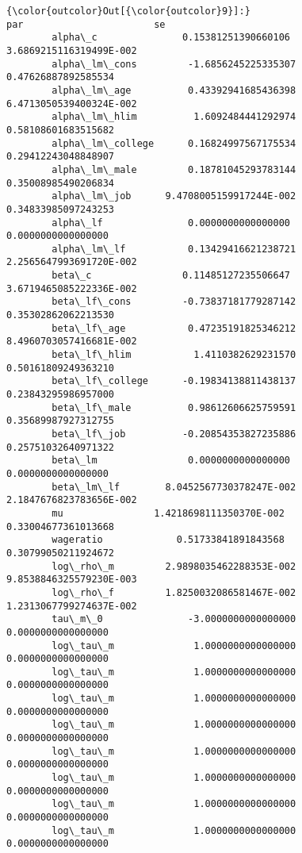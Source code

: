 \documentclass[11pt]{article}
\begin{document}
\begin{Verbatim}[commandchars=\\\{\}]
{\color{outcolor}Out[{\color{outcolor}9}]:}                                       par                       se
        alpha\_c               0.15381251390660106  3.6869215116319499E-002
        alpha\_lm\_cons         -1.6856245225335307      0.47626887892585534
        alpha\_lm\_age          0.43392941685436398  6.4713050539400324E-002
        alpha\_lm\_hlim          1.6092484441292974      0.58108601683515682
        alpha\_lm\_college      0.16824997567175534      0.29412243048848907
        alpha\_lm\_male         0.18781045293783144      0.35008985490206834
        alpha\_lm\_job      9.4708005159917244E-002      0.34833985097243253
        alpha\_lf               0.0000000000000000       0.0000000000000000
        alpha\_lm\_lf           0.13429416621238721  2.2565647993691720E-002
        beta\_c                0.11485127235506647  3.6719465085222336E-002
        beta\_lf\_cons         -0.73837181779287142      0.35302862062213530
        beta\_lf\_age           0.47235191825346212  8.4960703057416681E-002
        beta\_lf\_hlim           1.4110382629231570      0.50161809249363210
        beta\_lf\_college      -0.19834138811438137      0.23843295986957000
        beta\_lf\_male          0.98612606625759591      0.35689987927312755
        beta\_lf\_job          -0.20854353827235886      0.25751032640971322
        beta\_lm                0.0000000000000000       0.0000000000000000
        beta\_lm\_lf        8.0452567730378247E-002  2.1847676823783656E-002
        mu                1.4218698111350370E-002      0.33004677361013668
        wageratio             0.51733841891843568      0.30799050211924672
        log\_rho\_m         2.9898035462288353E-002  9.8538846325579230E-003
        log\_rho\_f         1.8250032086581467E-002  1.2313067799274637E-002
        tau\_m\_0               -3.0000000000000000       0.0000000000000000
        log\_tau\_m              1.0000000000000000       0.0000000000000000
        log\_tau\_m              1.0000000000000000       0.0000000000000000
        log\_tau\_m              1.0000000000000000       0.0000000000000000
        log\_tau\_m              1.0000000000000000       0.0000000000000000
        log\_tau\_m              1.0000000000000000       0.0000000000000000
        log\_tau\_m              1.0000000000000000       0.0000000000000000
        log\_tau\_m              1.0000000000000000       0.0000000000000000
        log\_tau\_m              1.0000000000000000       0.0000000000000000

\end{Verbatim}
\end{document}
